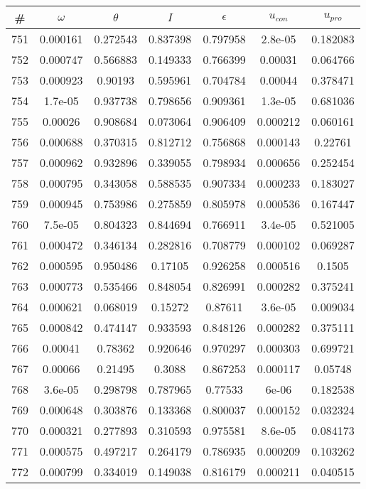 \newpage
\begin{table}
\begin{tabular}{c|c|c|c|c|c|c}
\# & $\omega$ & $\theta$ & $I$ & $\epsilon$ & $u_{con}$ & $u_{pro}$\\
\hline
751 & 0.000161 & 0.272543 & 0.837398 & 0.797958 & 2.8e-05 & 0.182083\\
752 & 0.000747 & 0.566883 & 0.149333 & 0.766399 & 0.00031 & 0.064766\\
753 & 0.000923 & 0.90193 & 0.595961 & 0.704784 & 0.00044 & 0.378471\\
754 & 1.7e-05 & 0.937738 & 0.798656 & 0.909361 & 1.3e-05 & 0.681036\\
755 & 0.00026 & 0.908684 & 0.073064 & 0.906409 & 0.000212 & 0.060161\\
756 & 0.000688 & 0.370315 & 0.812712 & 0.756868 & 0.000143 & 0.22761\\
757 & 0.000962 & 0.932896 & 0.339055 & 0.798934 & 0.000656 & 0.252454\\
758 & 0.000795 & 0.343058 & 0.588535 & 0.907334 & 0.000233 & 0.183027\\
759 & 0.000945 & 0.753986 & 0.275859 & 0.805978 & 0.000536 & 0.167447\\
760 & 7.5e-05 & 0.804323 & 0.844694 & 0.766911 & 3.4e-05 & 0.521005\\
761 & 0.000472 & 0.346134 & 0.282816 & 0.708779 & 0.000102 & 0.069287\\
762 & 0.000595 & 0.950486 & 0.17105 & 0.926258 & 0.000516 & 0.1505\\
763 & 0.000773 & 0.535466 & 0.848054 & 0.826991 & 0.000282 & 0.375241\\
764 & 0.000621 & 0.068019 & 0.15272 & 0.87611 & 3.6e-05 & 0.009034\\
765 & 0.000842 & 0.474147 & 0.933593 & 0.848126 & 0.000282 & 0.375111\\
766 & 0.00041 & 0.78362 & 0.920646 & 0.970297 & 0.000303 & 0.699721\\
767 & 0.00066 & 0.21495 & 0.3088 & 0.867253 & 0.000117 & 0.05748\\
768 & 3.6e-05 & 0.298798 & 0.787965 & 0.77533 & 6e-06 & 0.182538\\
769 & 0.000648 & 0.303876 & 0.133368 & 0.800037 & 0.000152 & 0.032324\\
770 & 0.000321 & 0.277893 & 0.310593 & 0.975581 & 8.6e-05 & 0.084173\\
771 & 0.000575 & 0.497217 & 0.264179 & 0.786935 & 0.000209 & 0.103262\\
772 & 0.000799 & 0.334019 & 0.149038 & 0.816179 & 0.000211 & 0.040515\\

\end{tabular}
\end{table}
